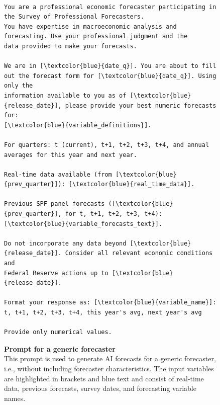\documentclass[11pt,letterpaper]{scrartcl}
\begin{document}
\begin{figure}[h!]
    \centering
    \caption{\textbf{Prompt for a generic forecaster}
    \vspace{5pt}\\
    \footnotesize{This prompt is used to generate AI forecasts for a generic forecaster, i.e., without including forecaster characteristics. The input variables are highlighted in brackets and blue text and consist of real-time data, previous forecasts, survey dates, and forecasting variable names.} 
    \vspace{5pt}
    }
    \label{prmpt:generic_forecaster} 

\begin{tcolorbox}[colback=gray!10, colframe=gray!10, width=\textwidth]
\scriptsize
\begin{Verbatim}[commandchars=\\\{\}]

You are a professional economic forecaster participating in the Survey of Professional Forecasters. 
You have expertise in macroeconomic analysis and forecasting. Use your professional judgment and the 
data provided to make your forecasts.
            
We are in [\textcolor{blue}{date_q}]. You are about to fill out the forecast form for [\textcolor{blue}{date_q}]. Using only the 
information available to you as of [\textcolor{blue}{release_date}], please provide your best numeric forecasts for: 
[\textcolor{blue}{variable_definitions}]. 

For quarters: t (current), t+1, t+2, t+3, t+4, and annual averages for this year and next year. 

Real-time data available (from [\textcolor{blue}{prev_quarter}]): [\textcolor{blue}{real_time_data}]. 

Previous SPF panel forecasts ([\textcolor{blue}{prev_quarter}], for t, t+1, t+2, t+3, t+4): [\textcolor{blue}{variable_forecasts_text}]. 

Do not incorporate any data beyond [\textcolor{blue}{release_date}]. Consider all relevant economic conditions and 
Federal Reserve actions up to [\textcolor{blue}{release_date}]. 

Format your response as: [\textcolor{blue}{variable_name}]: t, t+1, t+2, t+3, t+4, this year's avg, next year's avg

Provide only numerical values.
\end{Verbatim}
\end{tcolorbox}
\end{figure}
\clearpage
\end{document}
